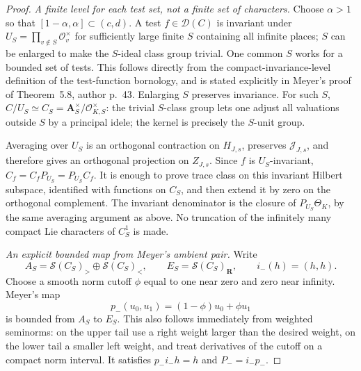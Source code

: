 \begin{proof}
\emph{A finite level for each test set, not a finite set of characters.}
Choose $\alpha>1$ so that
$[1-\alpha,\alpha]\subset(c,d)$.
A test $f\in\mathcal D(C)$ is invariant under
$U_S=\prod_{v\notin S}\mathcal O_v^\times$
for sufficiently large finite $S$ containing all
infinite places; $S$ can be enlarged to make the
$S$-ideal class group trivial. One common $S$ works
for a bounded set of tests. This follows directly
from the compact-invariance-level definition of
the test-function bornology, and is stated
explicitly in Meyer's proof of Theorem~5.8,
author p.~43. Enlarging $S$ preserves invariance.
For such $S$,
$C/U_S\simeq C_S=\mathbf A_S^\times/\mathcal O_{K,S}^\times$:
the trivial $S$-class group lets one adjust all
valuations outside $S$ by a principal idele; the
kernel is precisely the $S$-unit group.

Averaging over $U_S$ is an orthogonal contraction
on $H_{J,s}$, preserves $\mathcal J_{J,s}$, and
therefore gives an orthogonal projection on
$Z_{J,s}$. Since $f$ is $U_S$-invariant,
$C_f=C_fP_{U_S}=P_{U_S}C_f$.
It is enough to prove trace class on this invariant
Hilbert subspace, identified with functions on
$C_S$, and then extend it by zero on the orthogonal
complement. The invariant denominator is the
closure of $P_{U_S}\Theta_K$, by the same averaging
argument as above. No truncation of the infinitely
many compact Lie characters of $C_S^1$ is made.

\emph{An explicit bounded map from Meyer's ambient pair.}
Write
\[
 A_S=\mathcal S(C_S)_{>}\oplus\mathcal S(C_S)_{<},
 \qquad E_S=\mathcal S(C_S)_{\mathbf R},
 \qquad i_-(h)=(h,h).
\]
Choose a smooth norm cutoff $\phi$ equal to one
near zero and zero near infinity. Meyer's map
\[
        p_-(u_0,u_1)=(1-\phi)u_0+\phi u_1
                                                               \tag{M27.7}
\]
is bounded from $A_S$ to $E_S$.
This also follows immediately from weighted
seminorms: on the upper tail use a right weight
larger than the desired weight, on the lower
tail a smaller left weight, and treat derivatives
of the cutoff on a compact norm interval.
It satisfies $p_-i_-h=h$ and $P_-=i_-p_-$.


\end{proof}
